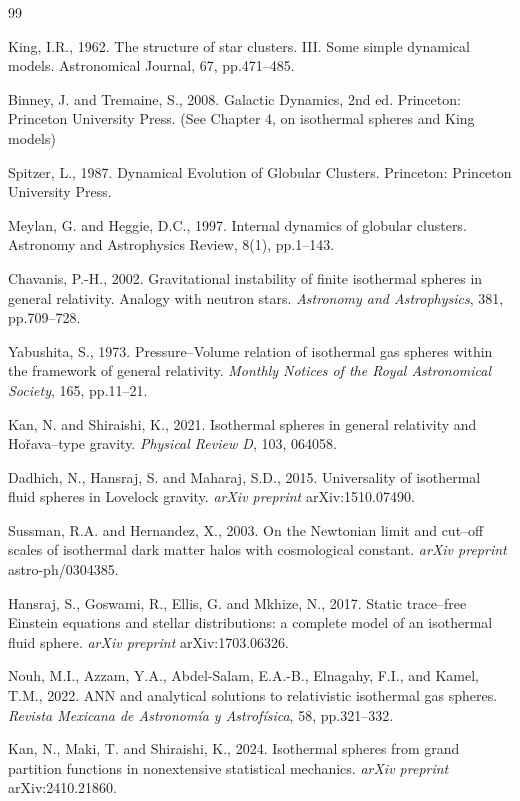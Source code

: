 \documentclass[12pt,a4paper]{article}
\numberwithin{equation}{section}
\begin{document}
\begin{thebibliography}{99}
\item King, I.R., 1962. The structure of star clusters. III. Some simple dynamical models. Astronomical Journal, 67, pp.471–485.

\item Binney, J. and Tremaine, S., 2008. Galactic Dynamics, 2nd ed. Princeton: Princeton University Press. (See Chapter 4, on isothermal spheres and King models)

\item Spitzer, L., 1987. Dynamical Evolution of Globular Clusters. Princeton: Princeton University Press.

\item Meylan, G. and Heggie, D.C., 1997. Internal dynamics of globular clusters. Astronomy and Astrophysics Review, 8(1), pp.1–143.


\item Chavanis, P.-H., 2002. Gravitational instability of finite isothermal spheres in general relativity. Analogy with neutron stars. \emph{Astronomy and Astrophysics}, 381, pp.709--728.
    
\item Yabushita, S., 1973. Pressure--Volume relation of isothermal gas spheres within the framework of general relativity. \emph{Monthly Notices of the Royal Astronomical Society}, 165, pp.11--21.
    
\item Kan, N. and Shiraishi, K., 2021. Isothermal spheres in general relativity and Hořava--type gravity. \emph{Physical Review D}, 103, 064058.
    
\item Dadhich, N., Hansraj, S. and Maharaj, S.D., 2015. Universality of isothermal fluid spheres in Lovelock gravity. \emph{arXiv preprint} arXiv:1510.07490.
    
\item Sussman, R.A. and Hernandez, X., 2003. On the Newtonian limit and cut--off scales of isothermal dark matter halos with cosmological constant. \emph{arXiv preprint} astro-ph/0304385.
    
\item Hansraj, S., Goswami, R., Ellis, G. and Mkhize, N., 2017. Static trace--free Einstein equations and stellar distributions: a complete model of an isothermal fluid sphere. \emph{arXiv preprint} arXiv:1703.06326.
    
\item Nouh, M.I., Azzam, Y.A., Abdel-Salam, E.A.-B., Elnagahy, F.I., and Kamel, T.M., 2022. ANN and analytical solutions to relativistic isothermal gas spheres. \emph{Revista Mexicana de Astronomía y Astrofísica}, 58, pp.321--332.

\item Kan, N., Maki, T. and Shiraishi, K., 2024. Isothermal spheres from grand partition functions in nonextensive statistical mechanics. \emph{arXiv preprint} arXiv:2410.21860.


\end{thebibliography}
\end{document}

